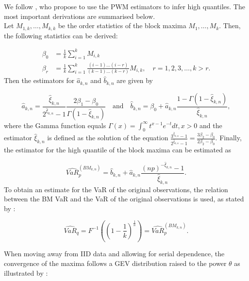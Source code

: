 

We follow , who propose to use the PWM estimators to infer high quantiles. The most important derivations are summarised below.\\

Let $M_{1,k}, \dots, M_{k,k}$ be the order statistics of the block maxima $M_1, \dots, M_k$. Then, the following statistics can be derived:

\begin{equation}
    \begin{split}
        \beta_0 &= \frac{1}{k}\sum^{k}_{i=1}M_{i,k} \\
        \beta_r &= \frac{1}{k}\sum^{k}_{i=1}\frac{\left(i-1\right) \dots \left(i-r\right)}{\left(k-1\right) \dots \left(k-r\right)}M_{i,k}, \quad r=1,2,3,\dots,k>r.
    \end{split}
\end{equation}
Then the estimators for $\hat{a}_{k,n}$ and $\hat{b}_{k,n}$ are given by

\begin{equation}
        \hat{a}_{k,n} = \frac{\hat{\xi}_{k,n}}{2^{\hat{\xi}_{k,n}}-1}\frac{2\beta_1-\beta_0}{\Gamma\left(1-\hat{\xi}_{k,n}\right)} \quad \text{and} \quad \hat{b}_{k,n} = \beta_0 + \hat{a}_{k,n}\frac{1-\Gamma\left(1-\hat{\xi}_{k,n}\right)}{\hat{\xi}_{k,n}},
\end{equation}
where the Gamma function equals $\Gamma\left(x\right)=\int_0^{\infty}t^{x-1}e^{-t}dt, x>0$ and the estimator $\hat{\xi}_{k,n}$ is defined as the solution of the equation $\frac{3^{\hat{\xi}_{k,n}}-1}{2^{\hat{\xi}_{k,n}}-1}=\frac{3\beta_2-\beta_0}{2\beta_2-\beta_0}$. Finally, the estimator for the high quantile of the block maxima can be estimated as

\begin{equation}
    \widehat{VaR}_p^{(BM_{k,n})} = \hat{b}_{k,n} + \hat{a}_{k,n}\frac{\left(np\right)^{-\hat{\xi}_{k,n}}-1}{\hat{\xi}_{k,n}}.
\end{equation}
To obtain an estimate for the VaR of the original observations, the relation between the BM VaR and the VaR of the original observations is used, as stated by :

\begin{equation}
    \widehat{VaR}_q = F^{-1}\left(\left(1-\frac{1}{k}\right)^{\frac{1}{n}}\right) = \widehat{VaR}_p^{(BM_{k,n})}.
\end{equation}

When moving away from IID data and allowing for serial dependence, the convergence of the maxima follows a GEV distribution raised to the power $\theta$ as illustrated by :

